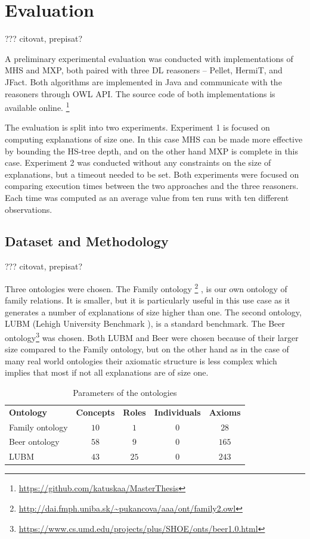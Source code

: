 \documentclass[12pt,a4paper]{article}
\begin{document}
\section{Evaluation}
??? citovat, prepisat?

A preliminary experimental evaluation was conducted with implementations of
MHS and MXP, both paired with three  DL reasoners -- Pellet, HermiT, and
JFact. Both algorithms are implemented in Java and communicate with the
reasoners through OWL API.
%
The source code of both implementations is available online.%
\footnote{\url{https://github.com/katuskaa/MasterThesis}}

The evaluation is split into two experiments. Experiment 1 is focused on
computing explanations of size one. In this case MHS can be
made more effective by bounding the HS-tree depth, and on the other hand
MXP is complete in this case. Experiment 2 was conducted without any
constraints on the size of explanations, but a timeout needed to be set. Both
experiments were focused on comparing execution times between the two
approaches and the three reasoners. Each time was computed as an average
value from ten runs with ten different observations.

\subsection{Dataset and Methodology}
??? citovat, prepisat?

Three ontologies were chosen. The Family ontology%
\footnote{\url{http://dai.fmph.uniba.sk/~pukancova/aaa/ont/family2.owl}}%
, is our own ontology of family relations. It is smaller,
but it is particularly useful in this use case as it generates a number of
explanations of size higher than one. The second ontology, LUBM (Lehigh University
Benchmark \cite{LUBM}), is a standard benchmark. The Beer
ontology\footnote{\url{https://www.cs.umd.edu/projects/plus/SHOE/onts/beer1.0.html}}
was chosen. Both LUBM and Beer were chosen because of their larger size compared to the Family ontology, but on the other hand as in the case of many real world ontologies their axiomatic structure is less complex which implies that most if not all explanations are
of size one.

\begin{table}[h!]
	\centering
	\caption{Parameters of the ontologies}
	\label{tab:ont}
	\begin{tabular}{lcccc}
		\textbf{Ontology} & \textbf{Concepts} & \textbf{Roles} & \textbf{Individuals} & \textbf{Axioms} \\
		Family ontology & $10$ & $1$ & $0$ & $28$\\
		Beer ontology & $58$ & $9$ & $0$ & $165$\\
		LUBM & $43$ & $25$ & $0$ & $243$
	\end{tabular}
\end{table}
\end{document}
